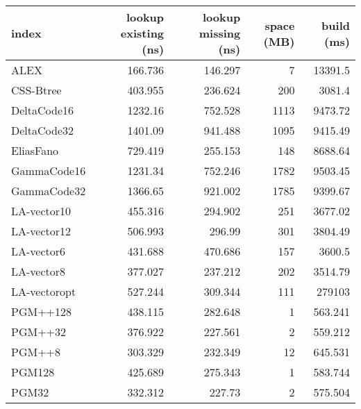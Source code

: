 \begin{tabular}{lrrrr}
\hline
 index             &   lookup existing (ns) &   lookup missing (ns) &   space (MB) &       build (ms) \\
\hline
 ALEX              &                166.736 &              146.297  &            7 &  13391.5         \\
 CSS-Btree         &                403.955 &              236.624  &          200 &   3081.4         \\
 DeltaCode16       &               1232.16  &              752.528  &         1113 &   9473.72        \\
 DeltaCode32       &               1401.09  &              941.488  &         1095 &   9415.49        \\
 EliasFano         &                729.419 &              255.153  &          148 &   8688.64        \\
 GammaCode16       &               1231.34  &              752.246  &         1782 &   9503.45        \\
 GammaCode32       &               1366.65  &              921.002  &         1785 &   9399.67        \\
 LA-vector10       &                455.316 &              294.902  &          251 &   3677.02        \\
 LA-vector12       &                506.993 &              296.99   &          301 &   3804.49        \\
 LA-vector6        &                431.688 &              470.686  &          157 &   3600.5         \\
 LA-vector8        &                377.027 &              237.212  &          202 &   3514.79        \\
 LA-vectoropt      &                527.244 &              309.344  &          111 & 279103           \\
 PGM++128          &                438.115 &              282.648  &            1 &    563.241       \\
 PGM++32           &                376.922 &              227.561  &            2 &    559.212       \\
 PGM++8            &                303.329 &              232.349  &           12 &    645.531       \\
 PGM128            &                425.689 &              275.343  &            1 &    583.744       \\
 PGM32             &                332.312 &              227.73   &            2 &    575.504       \\

\end{tabular}
